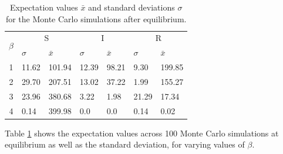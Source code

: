 \begin{table}[H]
\centering
\begin{tabular}{|c||l|l||l|l||l|l|}
\hline
\multirow{2}{*}{$\beta$}
    & \multicolumn{2}{c||}{S}
        & \multicolumn{2}{|c||}{I}
            & \multicolumn{2}{|c|}{R} \\   \cline{2-7}
 & $\sigma$ & $\bar{x}$ & $\sigma$ & $\bar{x}$ & $\sigma$ & $\bar{x}$\\ \hline
 1&11.62&101.94&12.39&98.21&9.30&199.85 \\ \hline
 2&29.70&207.51&13.02&37.22&1.99&155.27 \\ \hline
 3&23.96&380.68&3.22&1.98&21.29&17.34 \\ \hline
 4&0.14&399.98&0.0&0.0&0.14&0.02 \\ \hline
\end{tabular}
\caption{Expectation values $\bar{x}$ and standard deviations $\sigma$ for the Monte Carlo simulations after equilibrium.}
\label{table:3}
\end{table}
Table \ref{table:3} shows the expectation values across 100 Monte Carlo simulations at equilibrium as well as the standard deviation, for varying values of $\beta$. 

